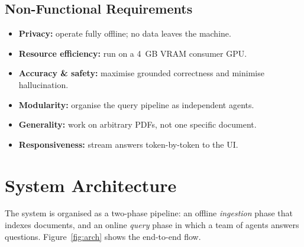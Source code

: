 \documentclass[12pt,a4paper]{report}
\begin{document}
\subsection{Non-Functional Requirements}
\begin{itemize}[leftmargin=1.4em]
  \item \textbf{Privacy:} operate fully offline; no data leaves the machine.
  \item \textbf{Resource efficiency:} run on a 4~GB VRAM consumer GPU.
  \item \textbf{Accuracy \& safety:} maximise grounded correctness and minimise
        hallucination.
  \item \textbf{Modularity:} organise the query pipeline as independent agents.
  \item \textbf{Generality:} work on arbitrary PDFs, not one specific document.
  \item \textbf{Responsiveness:} stream answers token-by-token to the UI.
\end{itemize}

\section{System Architecture}
The system is organised as a two-phase pipeline: an offline \emph{ingestion} phase
that indexes documents, and an online \emph{query} phase in which a team of agents
answers questions. Figure~\ref{fig:arch} shows the end-to-end flow.
\end{document}
